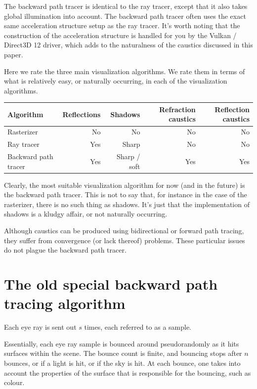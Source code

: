 \documentclass[12pt]{article}
\begin{document}
The backward path tracer is identical to the ray tracer, except that it also takes global illumination into account.
The backward path tracer often uses the exact same acceleration structure setup as the ray tracer.
It's worth noting that the construction of the acceleration structure is handled for you by the Vulkan / Direct3D 12 driver, which adds to the naturalness of the caustics discussed in this paper.


Here we rate the three main visualization algorithms.
We rate them in terms of what is relatively easy, or naturally occurring, in each of the visualization algorithms.
\begin{center}
\begin{tabular}{| l | r | r | r | r |}
  \hline
 Algorithm &  Reflections & Shadows & Refraction caustics & Reflection caustics \\
\hline
\hline
Rasterizer & No & No & No &  No \\
Ray tracer & Yes & Sharp & No & No  \\
Backward path tracer & Yes & Sharp / soft & Yes & Yes \\
  \hline  
\end{tabular}
\end{center}
Clearly, the most suitable visualization algorithm for now (and in the future) is the backward path tracer.
This is not to say that, for instance in the case of the rasterizer, there is no such thing as shadows.
It's just that the implementation of shadows is a kludgy affair, or not naturally occurring.

Although caustics can be produced using bidirectional or forward path tracing, they suffer from convergence (or lack thereof) problems.
These particular issues do not plague the backward path tracer.



\section{The old special backward path tracing algorithm}

Each eye ray is sent out $s$ times, each referred to as a sample.

Essentially, each eye ray sample is bounced around pseudorandomly as it hits surfaces within the scene.
The bounce count is finite, and bouncing stops after $n$ bounces, or if a light is hit, or if the sky is hit.
At each bounce, one takes into account the properties of the surface that is responsible for the bouncing, such as colour.
\end{document}
